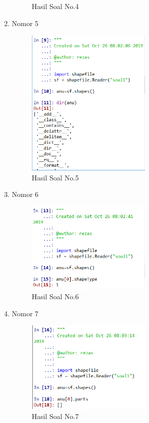 \begin{enumerate}
\begin{figure}[H]
		\centering
		\caption{Hasil Soal No.4}
	\end{figure}
	\item Nomor 5
	
	\begin{figure}[H]
		\includegraphics[width=6cm]{figures/Tugas3/1174084/5.png}
		\centering
		\caption{Hasil Soal No.5}
	\end{figure}
	\item Nomor 6
	
	\begin{figure}[H]
		\includegraphics[width=6cm]{figures/Tugas3/1174084/6.png}
		\centering
		\caption{Hasil Soal No.6}
	\end{figure}
	\item Nomor 7
	
	\begin{figure}[H]
		\includegraphics[width=6cm]{figures/Tugas3/1174084/7.png}
		\centering
		\caption{Hasil Soal No.7}
	\end{figure}

\end{enumerate}
